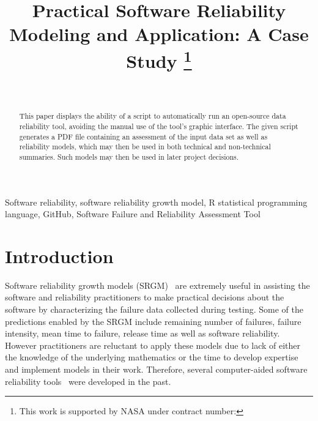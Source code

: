 \documentclass[journal]{IEEEtran}
\begin{document}
\title{Practical Software Reliability Modeling and Application: A Case Study
\thanks{This work is supported by NASA under contract number: }
}

\author{ \\%
\and
{}
}

\maketitle

\begin{abstract}
This paper displays the ability of a script to automatically run an open-source data reliability tool, avoiding the manual use of the tool's graphic interface. The given script generates a PDF file containing an assessment of the input data set as well as reliability models, which may then be used in both technical and non-technical summaries. Such models may then be used in later project decisions.
\end{abstract}

\begin{IEEEkeywords}
Software reliability, software reliability growth model, R statistical programming language, GitHub, Software Failure and Reliability Assessment Tool
\end{IEEEkeywords}


\section{Introduction}\label{sec:Intro}
Software reliability growth models (SRGM)~\cite{BookHoSRE} are extremely useful in assisting the software and reliability practitioners to make practical decisions about the software by characterizing the failure data collected during testing. Some of the predictions enabled by the SRGM include remaining number of failures, failure intensity, mean time to failure, release time as well as software reliability. However practitioners are reluctant to apply these models due to lack of either the knowledge of the underlying mathematics or the time to develop expertise and implement models in their work. Therefore, several computer-aided software reliability tools~\cite{trSMERFS,inProcISSRE2013_100,lyu1992casre} were developed in the past.
\end{document}
